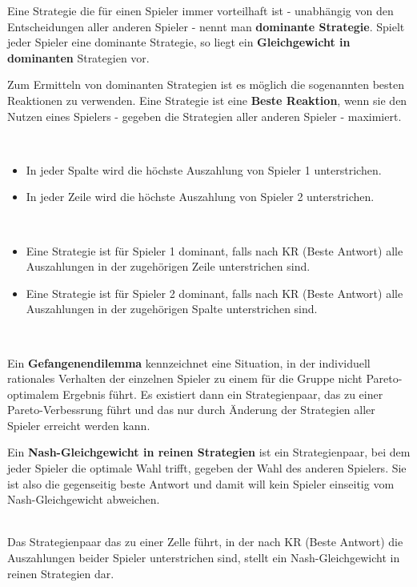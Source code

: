 Eine Strategie die für einen Spieler immer vorteilhaft ist - unabhängig von den Entscheidungen aller anderen Spieler - nennt man \textbf{dominante Strategie}. Spielt jeder Spieler eine dominante Strategie, so liegt ein \textbf{Gleichgewicht in dominanten} Strategien vor. ~\smallskip

Zum Ermitteln von dominanten Strategien ist es möglich die sogenannten besten Reaktionen zu verwenden. Eine Strategie ist eine \textbf{Beste Reaktion}, wenn sie den Nutzen eines Spielers - gegeben die Strategien aller anderen Spieler - maximiert. ~\smallskip

\begin{kr}~\
	\begin{itemize} 		
		\item In jeder Spalte wird die höchste Auszahlung von Spieler 1 unterstrichen. 
		\item In jeder Zeile wird die höchste Auszahlung von Spieler 2 unterstrichen.
	\end{itemize}	
\end{kr}

\begin{kr} ~\
	\begin{itemize}
		\item Eine Strategie ist für Spieler 1 dominant, falls nach KR (Beste Antwort) alle Auszahlungen in der zugehörigen Zeile unterstrichen sind.
		\item Eine Strategie ist für Spieler 2 dominant, falls nach KR (Beste Antwort) alle Auszahlungen in der zugehörigen Spalte unterstrichen sind.
	\end{itemize}	
\end{kr}  ~\smallskip

Ein \textbf{Gefangenendilemma} kennzeichnet eine Situation, in der individuell rationales Verhalten der einzelnen Spieler zu einem für die Gruppe nicht Pareto-optimalem Ergebnis führt. Es existiert dann ein Strategienpaar, das zu einer Pareto-Verbessrung führt und das nur durch Änderung der Strategien aller Spieler erreicht werden kann. ~\bigskip

Ein \textbf{Nash-Gleichgewicht in reinen Strategien} ist ein Strategienpaar, bei dem jeder Spieler die optimale Wahl trifft, gegeben der Wahl des anderen Spielers. Sie ist also die gegenseitig beste Antwort und damit will kein Spieler einseitig vom  Nash-Gleichgewicht abweichen.  ~\smallskip

\begin{kr}[Nash-Gleichgewicht in reinen Strategien] ~\\
	Das Strategienpaar das zu einer Zelle führt, in der nach KR (Beste Antwort) die Auszahlungen beider Spieler unterstrichen sind, stellt ein Nash-Gleichgewicht in reinen Strategien dar.
\end{kr}

